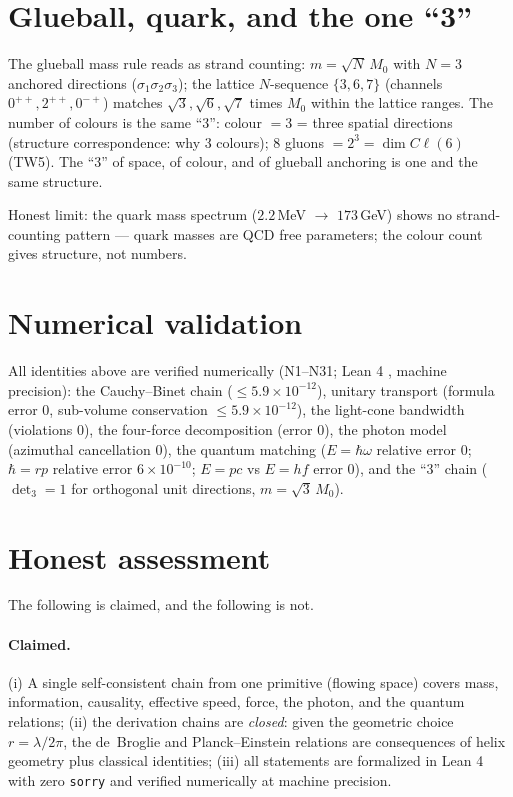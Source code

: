 \documentclass[aps,prd,preprint,superscriptaddress,amsmath,amssymb]{revtex4-2}
\begin{document}
\section{Glueball, quark, and the one ``3''}
\label{sec:glueball}

The glueball mass rule reads as strand counting: $m=\sqrt{N}\,M_0$ with
$N=3$ anchored directions ($\sigma_1\sigma_2\sigma_3$); the lattice
$N$-sequence $\{3,6,7\}$ \cite{morningstar1999glueball,chen2006glueball,navas2024review} (channels $0^{++},2^{++},0^{-+}$) matches
$\sqrt{3},\sqrt{6},\sqrt{7}$ times $M_0$ within the lattice ranges.  The
number of colours is the same ``3'': colour $=3$ = three spatial
directions (structure correspondence: why 3 colours); 8 gluons
$= 2^3 = \dim C\ell(6)$ (TW5).  The ``3'' of space, of colour, and of
glueball anchoring is one and the same structure.

Honest limit: the quark mass spectrum ($2.2$\,MeV $\to$ $173$\,GeV)
shows no strand-counting pattern --- quark masses are QCD free
parameters; the colour count gives structure, not numbers.

\section{Numerical validation}
\label{sec:validation}

All identities above are verified numerically (N1--N31; Lean 4 \cite{de2015lean}, machine
precision): the Cauchy--Binet chain ($\le 5.9\times10^{-12}$),
unitary transport (formula error $0$, sub-volume conservation
$\le 5.9\times10^{-12}$), the light-cone bandwidth (violations $0$),
the four-force decomposition (error $0$), the photon model
(azimuthal cancellation $0$), the quantum matching
($E=\hbar\omega$ relative error $0$; $\hbar=rp$ relative error
$6\times10^{-10}$; $E=pc$ vs $E=hf$ error $0$), and the ``3'' chain
($\det_3=1$ for orthogonal unit directions, $m=\sqrt3\,M_0$).

\section{Honest assessment}
\label{sec:honest}

The following is claimed, and the following is not.

\paragraph{Claimed.} (i) A single self-consistent chain from one
primitive (flowing space) covers mass, information, causality, effective
speed, force, the photon, and the quantum relations; (ii) the derivation
chains are \emph{closed}: given the geometric choice $r=\lambda/2\pi$,
the de~Broglie and Planck--Einstein relations are consequences of helix
geometry plus classical identities; (iii) all statements are formalized in
Lean 4 with zero \texttt{sorry} and verified numerically at machine
precision.
\end{document}
